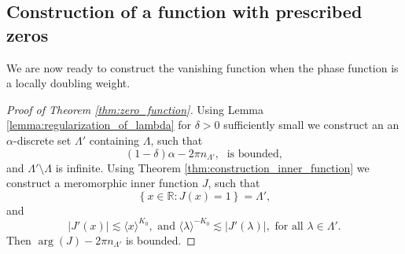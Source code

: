 \documentclass{article}[12pt]
\theoremstyle{remark}
\begin{document}
    \subsection{Construction of a function with prescribed zeros}
    
    We are now ready to construct the vanishing function when the phase function is a locally doubling weight.
        \begin{proof}[Proof of Theorem \ref{thm:zero_function}]
            Using Lemma \ref{lemma:regularization_of_lambda} for $\delta > 0$ sufficiently small we construct an an $\alpha$-discrete set $\Lambda'$ containing $\Lambda$, such that
            \begin{equation*}
                (1-\delta)\alpha -2\pi n_{\Lambda'}, \; \text{ is bounded},   
            \end{equation*}
            and $\Lambda' \setminus \Lambda$ is infinite. Using Theorem \ref{thm:construction_inner_function} we construct a meromorphic inner function $J$, such that
            \begin{equation*}
                \left\{ x \in \mathbb{R} : J(x) = 1 \right\} = \Lambda',
            \end{equation*}
            and
            \begin{equation*}
            \lvert J'(x) \rvert \lesssim \langle x\rangle^{K_{0}}, \text{ and } \langle \lambda \rangle^{-K_{0}} \lesssim\lvert J'(\lambda) \rvert, \text{ for all } \lambda \in \Lambda'.
            \end{equation*}
            Then $\arg(J)-2\pi n_{\Lambda'}$ is bounded.


\end{proof}
\end{document}

